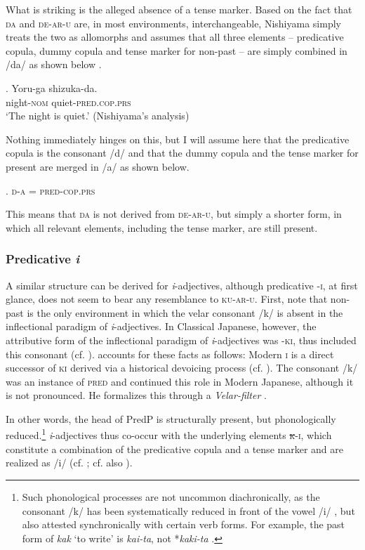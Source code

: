 \documentclass [output=book,colorlinks,citecolor=brown]{langscibook}
\begin{document}
What is striking is the alleged absence of a tense marker. Based on the fact that \textsc{da} and \textsc{de-ar-u} are, in most environments, interchangeable, Nishiyama simply treats the two as allomorphs and assumes that all three elements -- predicative copula, dummy copula and tense marker for non-past -- are simply combined in /da/ as shown below \citep[196–197]{nishiyama:1999:adj}.

\exg. Yoru-ga shizuka-da.\\
night-\textsc{nom} quiet-\textsc{pred.cop.prs}\\
`The night is quiet.' \null \hfill (Nishiyama's analysis)

Nothing immediately hinges on this, but I will assume here that the predicative copula is the consonant /d/ and that the dummy copula and the tense marker for present are merged in /a/ as shown below.

\ex. \textsc{d-a} = \textsc{pred-cop.prs}

This means that \textsc{da} is not derived from \textsc{de-ar-u}, but simply a shorter form, in which all relevant elements, including the tense marker, are still present.

\subsubsection{Predicative \textit{i}} \label{predicativei}

A similar structure can be derived for \textit{i}-adjectives, although predicative -\textsc{i}, at first glance, does not seem to bear any resemblance to \textsc{ku-ar-u}. First, note that non-past is the only environment in which the velar consonant /k/ is absent in the inflectional paradigm of \textit{i}-adjectives. In Classical Japanese, however, the attributive form of the inflectional paradigm of \textit{i}-adjectives was -\textsc{ki}, thus included this consonant (cf. \citealt[189–190]{nishiyama:1999:adj}). \citet{nishiyama:1999:adj} accounts for these facts as follows: Modern \textsc{i} is a direct successor of \textsc{ki} derived via a historical devoicing process (cf. \citealt{frellesvig:2010:history}). The consonant /k/ was an instance of \textsc{pred} and continued this role in Modern Japanese, although it is not pronounced. He formalizes this through a \textit{Velar-filter} \citep[191]{nishiyama:1999:adj}. %

In other words, the head of PredP is structurally present, but phonologically reduced.\footnote{Such phonological processes are not uncommon diachronically, as the consonant /k/ has been systematically reduced in front of the vowel /i/ \citep[340]{frellesvig:2010:history}, but also attested synchronically with certain verb forms. For example, the past form of \textit{kak} `to write' is \textit{kai-ta}, not *\textit{kaki-ta} \citep[191]{nishiyama:1999:adj}.} \textit{i}-adjectives thus co-occur with the underlying elements \textsc{\st{k}-i}, which constitute a combination of the predicative copula and a tense marker and are realized as /i/ (cf. \citealt[199–201]{nishiyama:1999:adj}; cf. also \citealt[2]{baker:2003:verbal}).
\end{document}
